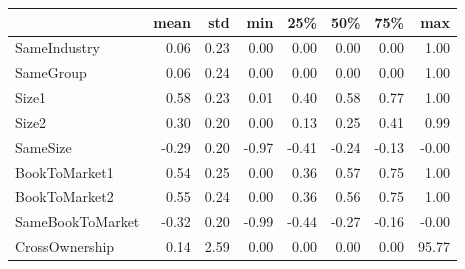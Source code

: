 \begin{tabular}{lrrrrrrr}
\toprule
{} &  mean &   std &   min &   25\% &   50\% &   75\% &    max \\
\midrule
SameIndustry     &  0.06 &  0.23 &  0.00 &  0.00 &  0.00 &  0.00 &   1.00 \\
SameGroup        &  0.06 &  0.24 &  0.00 &  0.00 &  0.00 &  0.00 &   1.00 \\
Size1            &  0.58 &  0.23 &  0.01 &  0.40 &  0.58 &  0.77 &   1.00 \\
Size2            &  0.30 &  0.20 &  0.00 &  0.13 &  0.25 &  0.41 &   0.99 \\
SameSize         & -0.29 &  0.20 & -0.97 & -0.41 & -0.24 & -0.13 &  -0.00 \\
BookToMarket1    &  0.54 &  0.25 &  0.00 &  0.36 &  0.57 &  0.75 &   1.00 \\
BookToMarket2    &  0.55 &  0.24 &  0.00 &  0.36 &  0.56 &  0.75 &   1.00 \\
SameBookToMarket & -0.32 &  0.20 & -0.99 & -0.44 & -0.27 & -0.16 &  -0.00 \\
CrossOwnership   &  0.14 &  2.59 &  0.00 &  0.00 &  0.00 &  0.00 &  95.77 \\
\bottomrule
\end{tabular}
